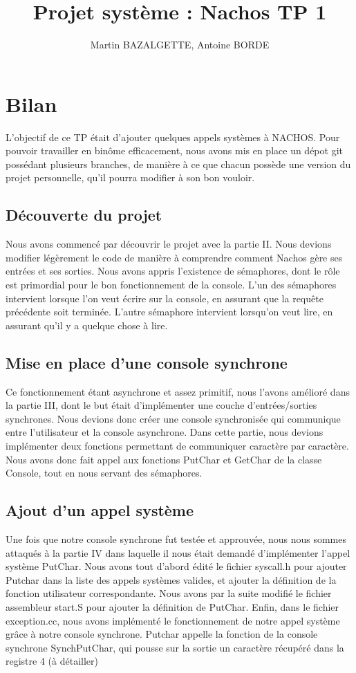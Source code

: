 \documentclass[12pt]{article}
\begin{document}
\title{Projet système : Nachos TP 1}
\author{Martin BAZALGETTE, Antoine BORDE}

\maketitle
\newpage
\tableofcontents
\newpage

\section{Bilan}
L'objectif de ce TP était d'ajouter quelques appels systèmes à NACHOS.
\newline
Pour pouvoir travailler en binôme efficacement, nous avons mis en place un dépot git possédant plusieurs branches, de manière à ce que chacun possède une version du projet personnelle, qu'il pourra modifier à son bon vouloir.
\newline
\subsection{Découverte du projet}
Nous avons commencé par découvrir le projet avec la partie II. Nous devions modifier légèrement le code de manière à comprendre comment Nachos gère ses entrées et ses sorties.
Nous avons appris l'existence de sémaphores, dont le rôle est primordial pour le bon fonctionnement de la console.
L'un des sémaphores intervient lorsque l'on veut écrire sur la console, en assurant que la requête précédente soit terminée. L'autre sémaphore intervient lorsqu'on veut lire, en assurant qu'il y a quelque chose à lire.
\subsection{Mise en place d'une console synchrone}
Ce fonctionnement étant asynchrone et assez primitif, nous l'avons amélioré dans la partie III, dont le but était d'implémenter une couche d'entrées/sorties synchrones. Nous devions donc créer une console synchronisée qui communique entre l'utilisateur et la console asynchrone. 
Dans cette partie, nous devions implémenter deux fonctions permettant de communiquer caractère par caractère. Nous avons donc fait appel aux fonctions PutChar et GetChar de la classe Console, tout en nous servant des sémaphores.
\newline
\subsection{Ajout d'un appel système}
Une fois que notre console synchrone fut testée et approuvée, nous nous sommes attaqués à la partie IV dans laquelle il nous était demandé d'implémenter l'appel système PutChar.
Nous avons tout d'abord édité le fichier syscall.h pour ajouter Putchar dans la liste des appels systèmes valides, et ajouter la définition de la fonction utilisateur correspondante. Nous avons par la suite modifié le fichier assembleur start.S pour ajouter la définition de PutChar.
Enfin, dans le fichier exception.cc, nous avons implémenté le fonctionnement de notre appel système grâce à notre console synchrone. Putchar appelle la fonction de la console synchrone SynchPutChar, qui pousse sur la sortie un caractère récupéré dans la registre 4 (à détailler)
\end{document}
